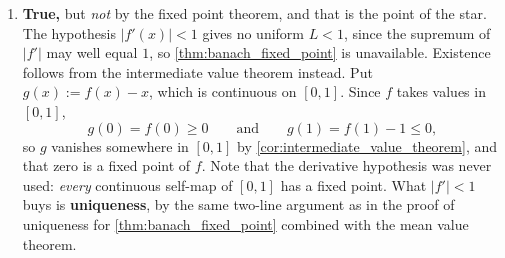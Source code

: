 \begin{exercisesolution}
\begin{enumerate}[label=\textbf{(\alph*)}]
    only along paths that stay inside the domain, and here there are none.
  \item \textbf{True,} but \emph{not} by the fixed point theorem, and that is the point of the
    star. The hypothesis $|f'(x)| < 1$ gives no uniform $L < 1$, since the supremum of $|f'|$ may
    well equal $1$, so \cref{thm:banach_fixed_point} is unavailable. Existence follows from the
    intermediate value theorem instead. Put $g(x) := f(x) - x$, which is continuous on $[0,1]$.
    Since $f$ takes values in $[0,1]$,
    \[g(0) = f(0) \geq 0 \qquad\text{and}\qquad g(1) = f(1) - 1 \leq 0,\]
    so $g$ vanishes somewhere in $[0,1]$ by \cref{cor:intermediate_value_theorem}, and that zero
    is a fixed point of $f$. Note that the derivative hypothesis was never used: \emph{every}
    continuous self-map of $[0,1]$ has a fixed point. What $|f'| < 1$ buys is
    \textbf{uniqueness}, by the same two-line argument as in the proof of uniqueness for
    \cref{thm:banach_fixed_point} combined with the mean value theorem.
\end{enumerate}
\end{exercisesolution}


